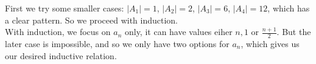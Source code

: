 \begin{solution}
    First we try some smaller cases: $ |A_1| = 1$, $ |A_2| = 2$, $ |A_3| = 6$,
    $ |A_4| = 12$, which has a clear pattern. So we proceed with induction.\\

    With induction, we focus on $a_n$ only, it can have values eiher $n, 1$ or
    $\frac{n+1}{2}$. But the later case is impossible, and so we only have two
    options for $a_n$, which gives us our desired inductive relation.
\end{solution}
